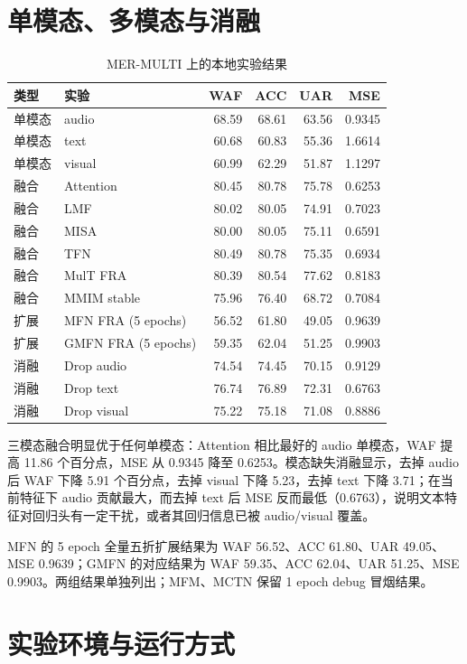 ﻿\documentclass[a4paper,11pt]{ctexart}
\begin{document}
\section{单模态、多模态与消融}

\begin{table}[htbp]
\centering
\small
\caption{MER-MULTI 上的本地实验结果}
\begin{tabular}{llrrrr}
\toprule
类型 & 实验 & WAF & ACC & UAR & MSE\\
\midrule
单模态 & audio & 68.59 & 68.61 & 63.56 & 0.9345\\
单模态 & text & 60.68 & 60.83 & 55.36 & 1.6614\\
单模态 & visual & 60.99 & 62.29 & 51.87 & 1.1297\\
融合 & Attention & 80.45 & 80.78 & 75.78 & 0.6253\\
融合 & LMF & 80.02 & 80.05 & 74.91 & 0.7023\\
融合 & MISA & 80.00 & 80.05 & 75.11 & 0.6591\\
融合 & TFN & 80.49 & 80.78 & 75.35 & 0.6934\\
融合 & MulT FRA & 80.39 & 80.54 & 77.62 & 0.8183\\
融合 & MMIM stable & 75.96 & 76.40 & 68.72 & 0.7084\\
扩展 & MFN FRA (5 epochs) & 56.52 & 61.80 & 49.05 & 0.9639\\
扩展 & GMFN FRA (5 epochs) & 59.35 & 62.04 & 51.25 & 0.9903\\
消融 & Drop audio & 74.54 & 74.45 & 70.15 & 0.9129\\
消融 & Drop text & 76.74 & 76.89 & 72.31 & 0.6763\\
消融 & Drop visual & 75.22 & 75.18 & 71.08 & 0.8886\\
\bottomrule
\end{tabular}
\end{table}

三模态融合明显优于任何单模态：Attention 相比最好的 audio 单模态，WAF 提高 11.86 个百分点，MSE 从 0.9345 降至 0.6253。模态缺失消融显示，去掉 audio 后 WAF 下降 5.91 个百分点，去掉 visual 下降 5.23，去掉 text 下降 3.71；在当前特征下 audio 贡献最大，而去掉 text 后 MSE 反而最低（0.6763），说明文本特征对回归头有一定干扰，或者其回归信息已被 audio/visual 覆盖。

MFN 的 5 epoch 全量五折扩展结果为 WAF 56.52、ACC 61.80、UAR 49.05、MSE 0.9639；GMFN 的对应结果为 WAF 59.35、ACC 62.04、UAR 51.25、MSE 0.9903。两组结果单独列出；MFM、MCTN 保留 1 epoch debug 冒烟结果。

\section{实验环境与运行方式}
\end{document}
